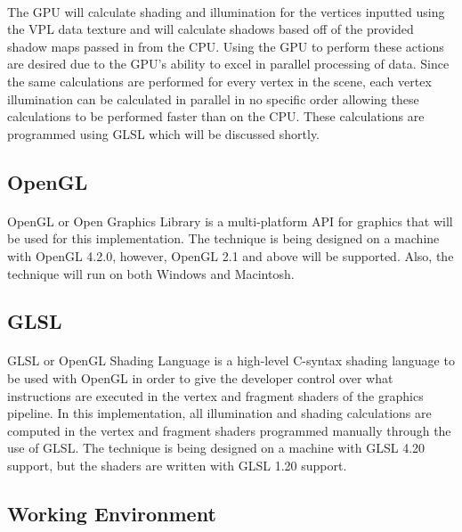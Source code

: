 \paragraph{}
The GPU will calculate shading and illumination for the vertices inputted using the VPL data texture and will calculate shadows based off of the provided shadow maps passed in from the CPU.  Using the GPU to perform these actions are desired due to the GPU's ability to excel in parallel processing of data.  Since the same calculations are performed for every vertex in the scene, each vertex illumination can be calculated in parallel in no specific order allowing these calculations to be performed faster than on the CPU.  These calculations are programmed using GLSL which will be discussed shortly.

\subsection{OpenGL}
\paragraph{}
OpenGL or Open Graphics Library is a multi-platform API for graphics that will be used for this implementation.  The technique is being designed on a machine with OpenGL 4.2.0, however, OpenGL 2.1 and above will be supported.  Also, the technique will run on both Windows and Macintosh.

\subsection{GLSL}
\paragraph{}
GLSL or OpenGL Shading Language is a high-level C-syntax shading language to be used with OpenGL in order to give the developer control over what instructions are executed in the vertex and fragment shaders of the graphics pipeline.  In this implementation, all illumination and shading calculations are computed in the vertex and fragment shaders programmed manually through the use of GLSL.  The technique is being designed on a machine with GLSL 4.20 support, but the shaders are written with GLSL 1.20 support.

\subsection{Working Environment}
